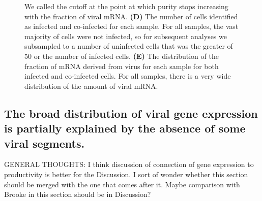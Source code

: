 \documentclass[9pt,lineno]{elife}
\begin{document}
\begin{figure}
{We called the cutoff at the point at which purity stops increasing with the fraction of viral mRNA.
{\bf (D)}
The number of cells identified as infected and co-infected for each sample.
For all samples, the vast majority of cells were not infected, so for subsequent analyses we subsampled to a number of uninfected cells that was the greater of 50 or the number of infected cells.
{\bf (E)} 
The distribution of the fraction of mRNA derived from virus for each sample for both infected and co-infected cells.
For all samples, there is a very wide distribution of the amount of viral mRNA.
}
\end{figure}

\subsection{The broad distribution of viral gene expression is partially explained by the absence of some viral segments.}
GENERAL THOUGHTS: I think discussion of connection of gene expression to productivity is better for the Discussion. I sort of wonder whether this section should be merged with the one that comes after it. Maybe comparison with Brooke in this section should be in Discussion?
\end{document}
